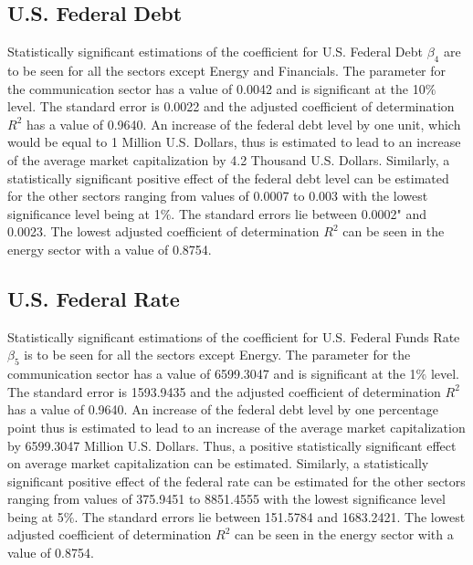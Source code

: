 \documentclass[a4paper,12pt]{article}
\begin{document}
\subsection{U.S. Federal Debt}

Statistically significant estimations of the coefficient for U.S. Federal Debt $\beta_4$ are to be seen for all the sectors except Energy and Financials. The parameter for the communication sector has a value of 0.0042 and is significant at the 10$\%$ level. The standard error is 0.0022 and the adjusted coefficient of determination ${R}^2$ has a value of 0.9640. An increase of the federal debt level by one unit, which would be equal to 1 Million U.S. Dollars, thus is estimated to lead to an increase of the average market capitalization by 4.2 Thousand U.S. Dollars. Similarly, a statistically significant positive effect of the federal debt level can be estimated for the other sectors ranging from values of 0.0007 to 0.003 with the lowest significance level being at 1$\%$. The standard errors lie between 0.0002" and 0.0023. The lowest adjusted coefficient of determination ${R}^2$ can be seen in the energy sector with a value of 0.8754.



\subsection{U.S. Federal Rate}


Statistically significant estimations of the coefficient for U.S. Federal Funds Rate $\beta_5$ is to be seen for all the sectors except Energy. The parameter for the communication sector has a value of 6599.3047 and is significant at the 1$\%$ level. The standard error is 1593.9435 and the adjusted coefficient of determination ${R}^2$ has a value of 0.9640. An increase of the federal debt level by one percentage point thus is estimated to lead to an increase of the average market capitalization by 6599.3047 Million U.S. Dollars. Thus, a positive statistically significant effect on average market capitalization can be estimated. Similarly, a statistically significant positive effect of the federal rate can be estimated for the other sectors ranging from values of 375.9451 to 8851.4555 with the lowest significance level being at 5$\%$. The standard errors lie between 151.5784 and 1683.2421. The lowest adjusted coefficient of determination ${R}^2$ can be seen in the energy sector with a value of 0.8754.

\clearpage
\end{document}
